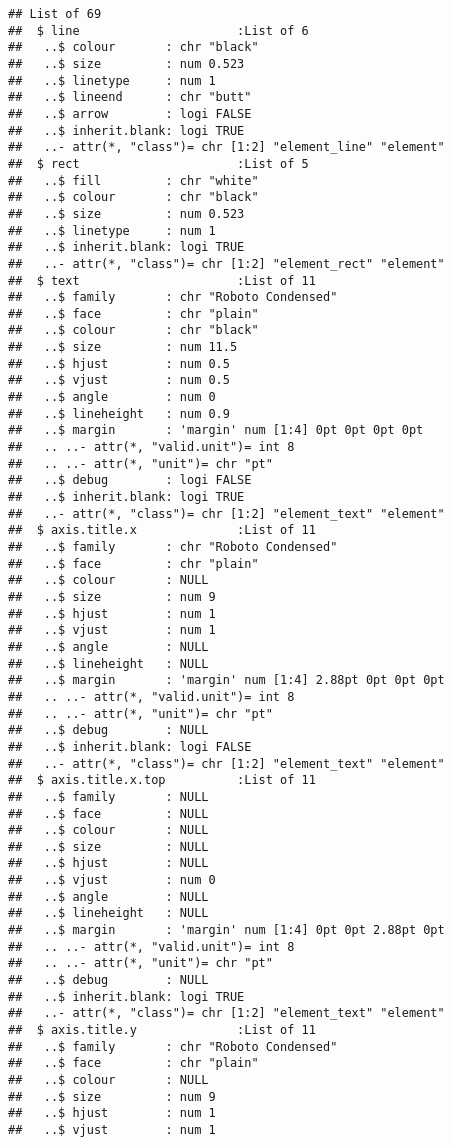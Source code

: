 \documentclass[
]{article}
\begin{document}
\begin{verbatim}
## List of 69
##  $ line                      :List of 6
##   ..$ colour       : chr "black"
##   ..$ size         : num 0.523
##   ..$ linetype     : num 1
##   ..$ lineend      : chr "butt"
##   ..$ arrow        : logi FALSE
##   ..$ inherit.blank: logi TRUE
##   ..- attr(*, "class")= chr [1:2] "element_line" "element"
##  $ rect                      :List of 5
##   ..$ fill         : chr "white"
##   ..$ colour       : chr "black"
##   ..$ size         : num 0.523
##   ..$ linetype     : num 1
##   ..$ inherit.blank: logi TRUE
##   ..- attr(*, "class")= chr [1:2] "element_rect" "element"
##  $ text                      :List of 11
##   ..$ family       : chr "Roboto Condensed"
##   ..$ face         : chr "plain"
##   ..$ colour       : chr "black"
##   ..$ size         : num 11.5
##   ..$ hjust        : num 0.5
##   ..$ vjust        : num 0.5
##   ..$ angle        : num 0
##   ..$ lineheight   : num 0.9
##   ..$ margin       : 'margin' num [1:4] 0pt 0pt 0pt 0pt
##   .. ..- attr(*, "valid.unit")= int 8
##   .. ..- attr(*, "unit")= chr "pt"
##   ..$ debug        : logi FALSE
##   ..$ inherit.blank: logi TRUE
##   ..- attr(*, "class")= chr [1:2] "element_text" "element"
##  $ axis.title.x              :List of 11
##   ..$ family       : chr "Roboto Condensed"
##   ..$ face         : chr "plain"
##   ..$ colour       : NULL
##   ..$ size         : num 9
##   ..$ hjust        : num 1
##   ..$ vjust        : num 1
##   ..$ angle        : NULL
##   ..$ lineheight   : NULL
##   ..$ margin       : 'margin' num [1:4] 2.88pt 0pt 0pt 0pt
##   .. ..- attr(*, "valid.unit")= int 8
##   .. ..- attr(*, "unit")= chr "pt"
##   ..$ debug        : NULL
##   ..$ inherit.blank: logi FALSE
##   ..- attr(*, "class")= chr [1:2] "element_text" "element"
##  $ axis.title.x.top          :List of 11
##   ..$ family       : NULL
##   ..$ face         : NULL
##   ..$ colour       : NULL
##   ..$ size         : NULL
##   ..$ hjust        : NULL
##   ..$ vjust        : num 0
##   ..$ angle        : NULL
##   ..$ lineheight   : NULL
##   ..$ margin       : 'margin' num [1:4] 0pt 0pt 2.88pt 0pt
##   .. ..- attr(*, "valid.unit")= int 8
##   .. ..- attr(*, "unit")= chr "pt"
##   ..$ debug        : NULL
##   ..$ inherit.blank: logi TRUE
##   ..- attr(*, "class")= chr [1:2] "element_text" "element"
##  $ axis.title.y              :List of 11
##   ..$ family       : chr "Roboto Condensed"
##   ..$ face         : chr "plain"
##   ..$ colour       : NULL
##   ..$ size         : num 9
##   ..$ hjust        : num 1
##   ..$ vjust        : num 1

\end{verbatim}
\end{document}
